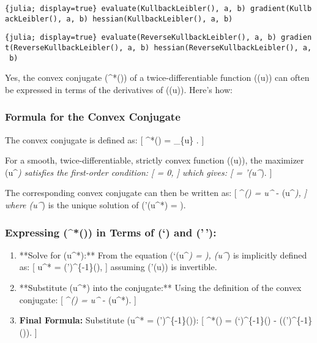 \documentclass[
  letterpaper,
  DIV=11,
  numbers=noendperiod]{scrartcl}
\begin{document}
\texttt{\{julia;\ display=true\}\ evaluate(KullbackLeibler(),\ a,\ b)\ gradient(KullbackLeibler(),\ a,\ b)\ hessian(KullbackLeibler(),\ a,\ b)}

\texttt{\{julia;\ display=true\}\ evaluate(ReverseKullbackLeibler(),\ a,\ b)\ gradient(ReverseKullbackLeibler(),\ a,\ b)\ hessian(ReverseKullbackLeibler(),\ a,\ b)}

Yes, the convex conjugate (\gamma\^{}*(\theta)) of a
twice-differentiable function (\gamma(u)) can often be expressed in
terms of the derivatives of (\gamma(u)). Here's how:

\subsubsection{Formula for the Convex
Conjugate}\label{formula-for-the-convex-conjugate}

The convex conjugate is defined as: {[} \gamma\^{}*(\theta) =
\sup\_\{u\} . {]}

For a smooth, twice-differentiable, strictly convex function
(\gamma(u)), the maximizer (u\^{}\emph{) satisfies the first-order
condition: {[} 
 = 0, {]} which gives: {[} \theta =
\gamma'(u\^{}}). {]}

The corresponding convex conjugate can then be written as: {[}
\gamma\^{}\emph{(\theta) = u\^{}} \theta - \gamma(u\^{}\emph{), {]}
where (u\^{}}) is the unique solution of (\gamma'(u\^{}*) = \theta).

\subsubsection{\texorpdfstring{Expressing (\gamma\^{}*(\theta)) in Terms
of (\gamma`) and
(\gamma'\,'):}{Expressing (\^{}*()) in Terms of (`) and ('\,'):}}\label{expressing-in-terms-of-and}

\begin{enumerate}
\def\labelenumi{\arabic{enumi}.}
\item
  **Solve for (u\^{}*):** From the equation (\gamma`(u\^{}\emph{) =
  \theta), (u\^{}}) is implicitly defined as: {[} u\^{}* =
  (\gamma')\^{}\{-1\}(\theta), {]} assuming (\gamma'(u)) is invertible.
\item
  **Substitute (u\^{}*) into the conjugate:** Using the definition of
  the convex conjugate: {[} \gamma\^{}\emph{(\theta) = u\^{}} \theta -
  \gamma(u\^{}*). {]}
\item
  \textbf{Final Formula:} Substitute (u\^{}* =
  (\gamma')\^{}\{-1\}(\theta)): {[} \gamma\^{}*(\theta) =
  (\gamma`)\^{}\{-1\}(\theta) \cdot \theta -
  \gamma\left((\gamma')\^{}\{-1\}(\theta)\right). {]}
\end{enumerate}
\end{document}
